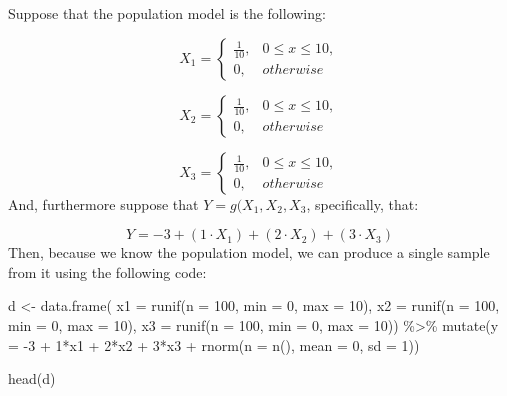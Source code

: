 \documentclass[
  letterpaper,
  DIV=11,
  numbers=noendperiod]{scrreprt}
\newenvironment{Shaded}{\begin{snugshade}}{\end{snugshade}}
\newcommand{\AttributeTok}[1]{\textcolor[rgb]{0.40,0.45,0.13}{#1}}
\newcommand{\DecValTok}[1]{\textcolor[rgb]{0.68,0.00,0.00}{#1}}
\newcommand{\FunctionTok}[1]{\textcolor[rgb]{0.28,0.35,0.67}{#1}}
\newcommand{\NormalTok}[1]{\textcolor[rgb]{0.00,0.23,0.31}{#1}}
\newcommand{\OtherTok}[1]{\textcolor[rgb]{0.00,0.23,0.31}{#1}}
\newcommand{\SpecialCharTok}[1]{\textcolor[rgb]{0.37,0.37,0.37}{#1}}
\begin{document}
Suppose that the population model is the following:

\[
X_{1} = 
\begin{cases}
  \frac{1}{10}, & 0 \leq x \leq 10, \\ 
  0, & otherwise
\end{cases}
\]

\[
X_{2} = 
\begin{cases}
  \frac{1}{10}, & 0 \leq x \leq 10, \\ 
  0, & otherwise
\end{cases}
\]

\[
X_{3} = 
\begin{cases}
  \frac{1}{10}, & 0 \leq x \leq 10, \\ 
  0, & otherwise
\end{cases}
\] And, furthermore suppose that \(Y = g(X_{1}, X_{2}, X_{3}\),
specifically, that:

\[
Y = -3 + (1\cdot X_1) + (2\cdot X_2) + (3\cdot X_3)
\] Then, because we know the population model, we can produce a single
sample from it using the following code:

\begin{Shaded}
\begin{Highlighting}[]
\NormalTok{d }\OtherTok{\textless{}{-}} \FunctionTok{data.frame}\NormalTok{(}
  \AttributeTok{x1 =} \FunctionTok{runif}\NormalTok{(}\AttributeTok{n =} \DecValTok{100}\NormalTok{, }\AttributeTok{min =} \DecValTok{0}\NormalTok{, }\AttributeTok{max =} \DecValTok{10}\NormalTok{), }
  \AttributeTok{x2 =} \FunctionTok{runif}\NormalTok{(}\AttributeTok{n =} \DecValTok{100}\NormalTok{, }\AttributeTok{min =} \DecValTok{0}\NormalTok{, }\AttributeTok{max =} \DecValTok{10}\NormalTok{), }
  \AttributeTok{x3 =} \FunctionTok{runif}\NormalTok{(}\AttributeTok{n =} \DecValTok{100}\NormalTok{, }\AttributeTok{min =} \DecValTok{0}\NormalTok{, }\AttributeTok{max =} \DecValTok{10}\NormalTok{)) }\SpecialCharTok{\%\textgreater{}\%} 
  \FunctionTok{mutate}\NormalTok{(}\AttributeTok{y =} \SpecialCharTok{{-}}\DecValTok{3} \SpecialCharTok{+} \DecValTok{1}\SpecialCharTok{*}\NormalTok{x1 }\SpecialCharTok{+} \DecValTok{2}\SpecialCharTok{*}\NormalTok{x2 }\SpecialCharTok{+} \DecValTok{3}\SpecialCharTok{*}\NormalTok{x3 }\SpecialCharTok{+} \FunctionTok{rnorm}\NormalTok{(}\AttributeTok{n =} \FunctionTok{n}\NormalTok{(), }\AttributeTok{mean =} \DecValTok{0}\NormalTok{, }\AttributeTok{sd =} \DecValTok{1}\NormalTok{))}

\FunctionTok{head}\NormalTok{(d)}
\end{Highlighting}
\end{Shaded}
\end{document}
